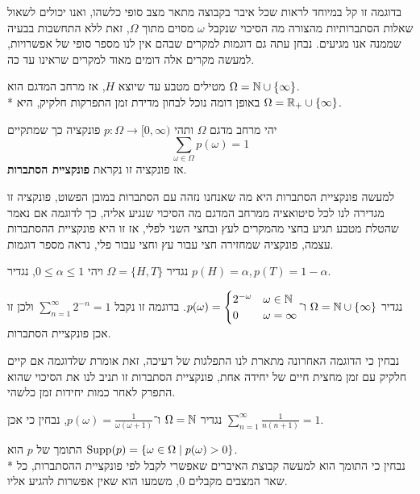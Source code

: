 בדוגמה זו קל במיוחד לראות שכל איבר בקבוצה מתאר מצב סופי כלשהו, ואנו יכולים לשאול שאלות הסתברותיות מהצורה מה הסיכוי שנקבל $\omega$ מסוים מתוך $\Omega$, זאת ללא התחשבות בבעיה שממנה אנו מגיעים.
נבחן עתה גם דוגמות למקרים שבהם אין לנו מספר סופי של אפשרויות, למעשה מקרים אלה דומים מאוד למקרים שראינו עד כה.
\begin{example}
	מטילים מטבע עד שיוצא $H$, אז מרחב המדגם הוא $\Omega = \mathbb{N} \cup \{ \infty \}$. \\*
	באופן דומה נוכל לבחון מדידת זמן התפרקות חלקיק, היא $\Omega = \mathbb{R}_+ \cup \{ \infty \}$.
\end{example}
\begin{definition}
	יהי מרחב מדגם $\Omega$ ותהי $p : \Omega \to [0, \infty)$ פונקציה כך שמתקיים
	\[
		\sum_{\omega \in \Omega} p(\omega) = 1
	\]
	אז פונקציה זו נקראת \textbf{פונקציית הסתברות}.
\end{definition}
למעשה פונקציית הסתברות היא מה שאנחנו נזהה עם הסתברות במובן הפשוט, פונקציה זו מגדירה לנו לכל סיטואציה ממרחב המדגם מה הסיכוי שנגיע אליה, כך לדוגמה אם נאמר שהטלת מטבע תגיע בחצי מהמקרים לעץ ובחצי השני לפלי,
אז זו היא פונקציית ההסתברות עצמה, פונקציה שמחזירה חצי עבור עץ וחצי עבור פלי, נראה מספר דוגמות.
\begin{example}
	נגדיר $\Omega = \{ H, T \}$ ויהי $0 \le \alpha \le 1$, נגדיר $p(H) = \alpha, p(T) = 1 - \alpha$.
\end{example}
\begin{example}
	נגדיר $\Omega = \mathbb{N} \cup \{ \infty \}$ ו־$p(\omega) = \begin{cases}
		2^{-\omega} & \omega \in \mathbb{N} \\
		0 & \omega = \infty
	\end{cases}$.
	בדוגמה זו נקבל $\sum_{n = 1}^{\infty} 2^{-n} = 1$ ולכן זו אכן פונקציית הסתברות.
\end{example}
נבחין כי הדוגמה האחרונה מתארת לנו התפלגות של דעיכה, זאת אומרת שלדוגמה אם קיים חלקיק עם זמן מחצית חיים של יחידה אחת, פונקציית הסתברות זו תניב לנו את הסיכוי שהוא התפרק לאחר כמות יחידות זמן כלשהי.
\begin{example}
	נגדיר $\Omega = \mathbb{N}$ ו־$p(\omega) = \frac{1}{\omega(\omega + 1)}$, נבחין כי אכן $\sum_{n = 1}^{\infty} \frac{1}{n(n + 1)} = 1$.
\end{example}
\begin{definition}[תומך]
	התומך של $p$ הוא $\operatorname{Supp}(p) = \{ \omega \in \Omega \mid p(\omega) > 0 \}$. \\*
	נבחין כי התומך הוא למעשה קבוצת האיברים שאפשרי לקבל לפי פונקציית ההסתברות, כל שאר המצבים מקבלים 0, משמעו הוא שאין אפשרות להגיע אליו.
\end{definition}
